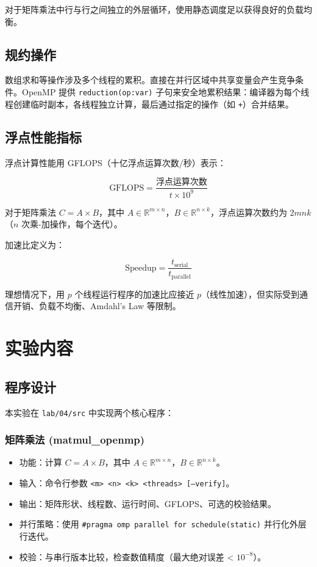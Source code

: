 \documentclass[12pt,a4paper]{ctexart}
\begin{document}
对于矩阵乘法中行与行之间独立的外层循环，使用静态调度足以获得良好的负载均衡。

\subsection{规约操作}
数组求和等操作涉及多个线程的累积。直接在并行区域中共享变量会产生竞争条件。OpenMP 提供 \texttt{reduction(op:var)} 子句来安全地累积结果：编译器为每个线程创建临时副本，各线程独立计算，最后通过指定的操作（如 \texttt{+}）合并结果。

\subsection{浮点性能指标}
浮点计算性能用 GFLOPS（十亿浮点运算次数/秒）表示：

\begin{equation}
\text{GFLOPS} = \frac{\text{浮点运算次数}}{t \times 10^9}
\end{equation}

对于矩阵乘法 $C = A \times B$，其中 $A \in \mathbb{R}^{m \times n}$，$B \in \mathbb{R}^{n \times k}$，浮点运算次数约为 $2mnk$（$n$ 次乘-加操作，每个迭代）。

加速比定义为：

\begin{equation}
\text{Speedup} = \frac{t_{\text{serial}}}{t_{\text{parallel}}}
\end{equation}

理想情况下，用 $p$ 个线程运行程序的加速比应接近 $p$（线性加速），但实际受到通信开销、负载不均衡、Amdahl's Law 等限制。

\section{实验内容}

\subsection{程序设计}
本实验在 \texttt{lab/04/src} 中实现两个核心程序：

\subsubsection{矩阵乘法 (matmul\_openmp)}
\begin{itemize}
  \item 功能：计算 $C = A \times B$，其中 $A \in \mathbb{R}^{m \times n}$，$B \in \mathbb{R}^{n \times k}$。
  \item 输入：命令行参数 \texttt{<m> <n> <k> <threads> [--verify]}。
  \item 输出：矩阵形状、线程数、运行时间、GFLOPS、可选的校验结果。
  \item 并行策略：使用 \texttt{\#pragma omp parallel for schedule(static)} 并行化外层行迭代。
  \item 校验：与串行版本比较，检查数值精度（最大绝对误差 < $10^{-8}$）。
\end{itemize}
\end{document}
